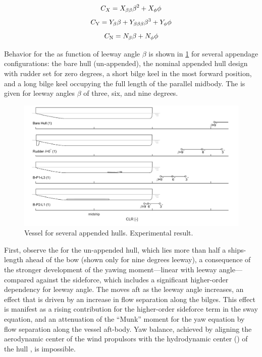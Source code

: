 \documentclass[twoside,twocolumn]{article}
\begin{document}
\begin{equation}
C_{X}=X_{\beta \beta}\beta^{2}+X_{\phi}\phi
\end{equation}
\begin{equation}
C_\mathrm{Y}=Y_{\beta}\beta+Y_{\beta \beta \beta}\beta^{3}+Y_{\phi}\phi
\end{equation}
\begin{equation}
C_\mathrm{N}=N_{\beta}\beta+N_{\phi}\phi
\end{equation}

Behavior for the \CLR as function of leeway angle $\beta$ is shown in \cref{fig:CLRdemo} for several appendage configurations: the bare hull (un-appended), the nominal appended hull design with rudder set for zero degrees, a short bilge keel in the most forward position, and a long bilge keel occupying the full length of the parallel midbody. The \CLR is given for leeway angles $\beta$ of three, six, and nine degrees. 

\begin{figure}[!th]
	\centering
	\includegraphics[width=\textwidth]{images/1_CLR_demo}
	\caption{Vessel \CLR for several appended hulls. Experimental result.}
	\label{fig:CLRdemo}
\end{figure}
\noindent
First, observe the \CLR for the un-appended hull, which lies more than half a ships-length ahead of the bow (shown only for nine degrees leeway), a consequence of the stronger development of the yawing moment—linear with leeway angle—compared against the sideforce, which includes a significant higher-order dependency for leeway angle. The \CLR moves aft as the leeway angle increases, an effect that is driven by an increase in flow separation along the bilges. This effect is manifest as a rising contribution for the higher-order sideforce term in the sway equation, and an attenuation of the “Munk” moment for the yaw equation by flow separation along the vessel aft-body. Yaw balance, achieved by aligning the aerodynamic center of the wind propulsors with the hydrodynamic center (\CLR) of the hull \cite{Claughton03}, is impossible.
\end{document}

